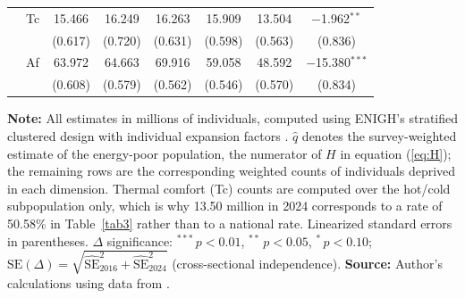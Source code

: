 \documentclass[11pt, a4paper]{article}
\begin{document}
\begin{table}[htb]
\begin{tabularx}{\textwidth}{l X cccccc}
& Tc & 15.466 & 16.249 & 16.263 & 15.909 & 13.504 & $-$1.962$^{**}$ \\
& & {\footnotesize (0.617)} & {\footnotesize (0.720)} & {\footnotesize (0.631)} & {\footnotesize (0.598)} & {\footnotesize (0.563)} & {\footnotesize (0.836)} \\[2pt]
& Af & 63.972 & 64.663 & 69.916 & 59.058 & 48.592 & $-$15.380$^{***}$ \\
& & {\footnotesize (0.608)} & {\footnotesize (0.579)} & {\footnotesize (0.562)} & {\footnotesize (0.546)} & {\footnotesize (0.570)} & {\footnotesize (0.834)} \\[4pt]
\bottomrule
\end{tabularx}
\begin{justify}
\scriptsize
\textbf{Note:} All estimates in millions of individuals, computed using ENIGH's stratified clustered design with individual expansion factors \parencite{inegi2023}. $\hat{q}$ denotes the survey-weighted estimate of the energy-poor population, the numerator of $H$ in equation (\ref{eq:H}); the remaining rows are the corresponding weighted counts of individuals deprived in each dimension. Thermal comfort (Tc) counts are computed over the hot/cold subpopulation only, which is why 13.50 million in 2024 corresponds to a rate of 50.58\% in Table~\ref{tab3} rather than to a national rate. Linearized standard errors in parentheses. $\Delta$ significance: $^{***}$\,$p<0.01$, $^{**}$\,$p<0.05$, $^{*}$\,$p<0.10$; $\mathrm{SE}(\Delta)=\sqrt{\widehat{\mathrm{SE}}_{2016}^2+\widehat{\mathrm{SE}}_{2024}^2}$ (cross-sectional independence). \textbf{Source:} Author's calculations using data from \textcite{enigh2016, enigh2018, enigh2020, enigh2022, enigh2024}.
\end{justify}
\label{tab3_1}
\end{table}
\end{document}
